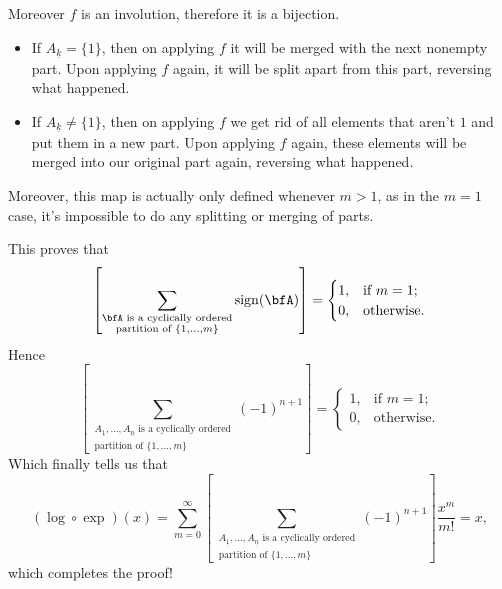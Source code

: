 \documentclass{article}
\DeclareMathOperator{\sign}{sign}
\begin{document}
Moreover $f$ is an involution, therefore it is a bijection.
\begin{itemize}
    \item
        If $A_{\underline{k}} = \{1\}$, then on applying $f$ it will be merged with the next nonempty part.
        Upon applying $f$ again, it will be split apart from this part, reversing what happened.
    \item 
        If $A_{\underline{k}} \neq \{1\}$, then on applying $f$ we get rid of all elements that aren't $1$ and put them in a new part.
        Upon applying $f$ again, these elements will be merged into our original part again, reversing what happened.
\end{itemize}

Moreover, this map is actually only defined whenever $m > 1$, as in the $m = 1$ case, it's impossible to do any splitting or merging of parts.

This proves that
\[
    \left[
        \sum_{
            \substack{
                \bfA \text{ is a cyclically ordered} \\
                \text{partition of }\{1,\ldots,m\}
            }
        }
        \sign(\bfA)
    \right]
    =
    \begin{cases}
        1, & \text{if } m=1; \\
        0, & \text{otherwise}.
    \end{cases}
\]
Hence
\[
    \left[
        \sum_{
            \substack{
                A_{\underline{1}},\ldots,A_{\underline{n}} \text{ is a cyclically ordered} \\
                \text{partition of }\{1,\ldots,m\}
            }
        }
        (-1)^{n+1}
    \right]
    =
    \begin{cases}
        1, & \text{if } m=1; \\
        0, & \text{otherwise}.
    \end{cases}
\]
Which finally tells us that
\[
    (\log \circ \exp)(x)
    =
    \sum_{m=0}^\infty
    \left[
        \sum_{
            \substack{
                A_{\underline{1}},\ldots,A_{\underline{n}} \text{ is a cyclically ordered} \\
                \text{partition of }\{1,\ldots,m\}
            }
        }
        (-1)^{n+1}
    \right]
    \frac{x^m}{m!}
    =
    x,
\]
which completes the proof!
\end{document}
